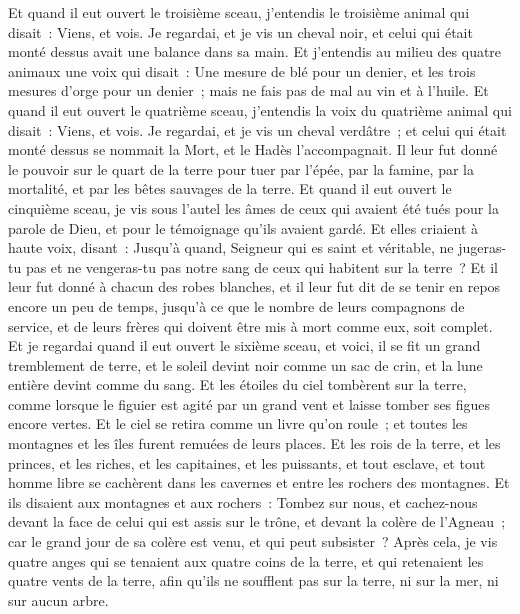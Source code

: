 \begin{multicols}{2}
Et quand il eut ouvert le troisième sceau, j'entendis le troisième animal qui disait~: Viens, et vois. Je regardai, et je vis un cheval noir, et celui qui était monté dessus avait une balance dans sa main.
Et j'entendis au milieu des quatre animaux une voix qui disait~: Une mesure de blé pour un denier, et les trois mesures d'orge pour un denier~; mais ne fais pas de mal au vin et à l'huile.
Et quand il eut ouvert le quatrième sceau, j'entendis la voix du quatrième animal qui disait~: Viens, et vois.
Je regardai, et je vis un cheval verdâtre~; et celui qui était monté dessus se nommait la Mort, et le Hadès l'accompagnait. Il leur fut donné le pouvoir sur le quart de la terre pour tuer par l'épée, par la famine, par la mortalité, et par les bêtes sauvages de la terre.
Et quand il eut ouvert le cinquième sceau, je vis sous l'autel les âmes de ceux qui avaient été tués pour la parole de Dieu, et pour le témoignage qu'ils avaient gardé.
Et elles criaient à haute voix, disant~: Jusqu'à quand, Seigneur qui es saint et véritable, ne jugeras-tu pas et ne vengeras-tu pas notre sang de ceux qui habitent sur la terre~?
Et il leur fut donné à chacun des robes blanches, et il leur fut dit de se tenir en repos encore un peu de temps, jusqu'à ce que le nombre de leurs compagnons de service, et de leurs frères qui doivent être mis à mort comme eux, soit complet.
Et je regardai quand il eut ouvert le sixième sceau, et voici, il se fit un grand tremblement de terre, et le soleil devint noir comme un sac de crin, et la lune entière devint comme du sang.
Et les étoiles du ciel tombèrent sur la terre, comme lorsque le figuier est agité par un grand vent et laisse tomber ses figues encore vertes.
Et le ciel se retira comme un livre qu'on roule~; et toutes les montagnes et les îles furent remuées de leurs places.
Et les rois de la terre, et les princes, et les riches, et les capitaines, et les puissants, et tout esclave, et tout homme libre se cachèrent dans les cavernes et entre les rochers des montagnes.
Et ils disaient aux montagnes et aux rochers~: Tombez sur nous, et cachez-nous devant la face de celui qui est assis sur le trône, et devant la colère de l'Agneau~;
car le grand jour de sa colère est venu, et qui peut subsister~?
\VerseOne{}Après cela, je vis quatre anges qui se tenaient aux quatre coins de la terre, et qui retenaient les quatre vents de la terre, afin qu'ils ne soufflent pas sur la terre, ni sur la mer, ni sur aucun arbre.

\end{multicols}
